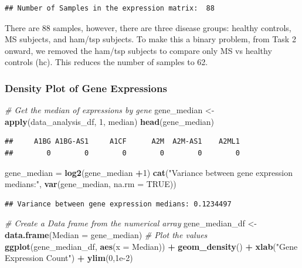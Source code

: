 \documentclass[
]{article}
\newenvironment{Shaded}{\begin{snugshade}}{\end{snugshade}}
\newcommand{\AttributeTok}[1]{\textcolor[rgb]{0.13,0.29,0.53}{#1}}
\newcommand{\CommentTok}[1]{\textcolor[rgb]{0.56,0.35,0.01}{\textit{#1}}}
\newcommand{\ConstantTok}[1]{\textcolor[rgb]{0.56,0.35,0.01}{#1}}
\newcommand{\DecValTok}[1]{\textcolor[rgb]{0.00,0.00,0.81}{#1}}
\newcommand{\FloatTok}[1]{\textcolor[rgb]{0.00,0.00,0.81}{#1}}
\newcommand{\FunctionTok}[1]{\textcolor[rgb]{0.13,0.29,0.53}{\textbf{#1}}}
\newcommand{\NormalTok}[1]{#1}
\newcommand{\OtherTok}[1]{\textcolor[rgb]{0.56,0.35,0.01}{#1}}
\newcommand{\SpecialCharTok}[1]{\textcolor[rgb]{0.81,0.36,0.00}{\textbf{#1}}}
\newcommand{\StringTok}[1]{\textcolor[rgb]{0.31,0.60,0.02}{#1}}
\begin{document}
\begin{verbatim}
## Number of Samples in the expression matrix:  88
\end{verbatim}

There are 88 samples, however, there are three disease groups: healthy
controls, MS subjects, and ham/tsp subjects. To make this a binary
problem, from Task 2 onward, we removed the ham/tsp subjects to compare
only MS vs healthy controls (hc). This reduces the number of samples to
62.

\subsubsection{Density Plot of Gene
Expressions}\label{density-plot-of-gene-expressions}

\begin{Shaded}
\begin{Highlighting}[]
\CommentTok{\# Get the median of expressions by gene}
\NormalTok{gene\_median }\OtherTok{\textless{}{-}} \FunctionTok{apply}\NormalTok{(data\_analysis\_df, }\DecValTok{1}\NormalTok{, median)}
\FunctionTok{head}\NormalTok{(gene\_median)}
\end{Highlighting}
\end{Shaded}

\begin{verbatim}
##     A1BG A1BG-AS1     A1CF      A2M  A2M-AS1    A2ML1 
##        0        0        0        0        0        0
\end{verbatim}

\begin{Shaded}
\begin{Highlighting}[]
\NormalTok{gene\_median }\OtherTok{=} \FunctionTok{log2}\NormalTok{(gene\_median }\SpecialCharTok{+}\DecValTok{1}\NormalTok{)}
\FunctionTok{cat}\NormalTok{(}\StringTok{"Variance between gene expression medians:"}\NormalTok{, }\FunctionTok{var}\NormalTok{(gene\_median, }\AttributeTok{na.rm =} \ConstantTok{TRUE}\NormalTok{))}
\end{Highlighting}
\end{Shaded}

\begin{verbatim}
## Variance between gene expression medians: 0.1234497
\end{verbatim}

\begin{Shaded}
\begin{Highlighting}[]
\CommentTok{\# Create a Data frame from the numerical array}
\NormalTok{gene\_median\_df }\OtherTok{\textless{}{-}} \FunctionTok{data.frame}\NormalTok{(}\AttributeTok{Median =}\NormalTok{ gene\_median)}
\CommentTok{\# Plot the values}
\FunctionTok{ggplot}\NormalTok{(gene\_median\_df, }\FunctionTok{aes}\NormalTok{(}\AttributeTok{x =}\NormalTok{ Median)) }\SpecialCharTok{+} \FunctionTok{geom\_density}\NormalTok{() }\SpecialCharTok{+} \FunctionTok{xlab}\NormalTok{(}\StringTok{"Gene Expression Count"}\NormalTok{) }\SpecialCharTok{+} \FunctionTok{ylim}\NormalTok{(}\DecValTok{0}\NormalTok{,}\FloatTok{1e{-}2}\NormalTok{)}
\end{Highlighting}
\end{Shaded}
\end{document}
